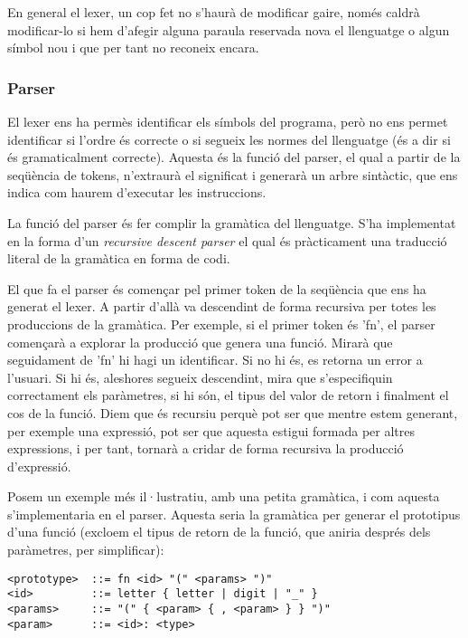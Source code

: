 ﻿\documentclass{article}
\begin{document}
En general el lexer, un cop fet no s'haurà de modificar gaire, només caldrà
modificar-lo si hem d'afegir alguna paraula reservada nova el llenguatge o algun
símbol nou i que per tant no reconeix encara.

\subsubsection{Parser}

El lexer ens ha permès identificar els símbols del programa, però no ens permet
identificar si l'ordre és correcte o si segueix les normes del llenguatge (és a
dir si és gramaticalment correcte). Aquesta és la funció del parser, el qual a
partir de la seqüència de tokens, n'extraurà el significat i generarà un arbre
sintàctic, que ens indica com haurem d'executar les instruccions.

La funció del parser és fer complir la gramàtica del llenguatge. S'ha
implementat en la forma d'un \textit{recursive descent parser} el qual és
pràcticament una traducció literal de la gramàtica en forma de codi.

El que fa el parser és començar pel primer token de la seqüència que ens ha
generat el lexer. A partir d'allà va descendint de forma recursiva per totes les
produccions de la gramàtica. Per exemple, si el primer token és 'fn', el parser
començarà a explorar la producció que genera una funció. Mirarà que seguidament
de 'fn' hi hagi un identificar. Si no hi és, es retorna un error a l'usuari. Si
hi és, aleshores segueix descendint, mira que s'especifiquin correctament els
paràmetres, si hi són, el tipus del valor de retorn i finalment el cos de la
funció. Diem que és recursiu perquè pot ser que mentre estem generant, per
exemple una expressió, pot ser que aquesta estigui formada per altres
expressions, i per tant, tornarà a cridar de forma recursiva la producció
d'expressió.

Posem un exemple més il·lustratiu, amb una petita gramàtica, i com aquesta
s'implementaria en el parser. Aquesta seria la gramàtica per generar el
prototipus d'una funció (excloem el tipus de retorn de la funció, que aniria
després dels paràmetres, per simplificar):

\begin{verbatim}
<prototype>  ::= fn <id> "(" <params> ")"
<id>         ::= letter { letter | digit | "_" }
<params>     ::= "(" { <param> { , <param> } } ")"
<param>      ::= <id>: <type>
\end{verbatim}
\end{document}
